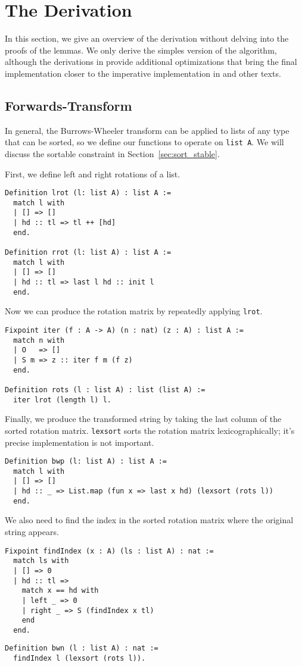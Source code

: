 \documentclass[11pt]{article}
\begin{document}
\section{The Derivation}
\label{sec:deriv}
In this section, we give an overview of the derivation without delving
into the proofs of the lemmas. We only derive the simples version of
the algorithm, although the derivations in \cite{birdmu,pearls}
provide additional optimizations that bring the final implementation
closer to the imperative implementation in \cite{bw} and other texts.

\subsection{Forwards-Transform}
\label{subsec:ft}
In general, the Burrows-Wheeler transform can be applied to lists of
any type that can be sorted, so we define our functions to operate on
\verb|list A|. We will discuss the sortable constraint in
Section~\autoref{sec:sort_stable}.

First, we define left and right rotations of a list.
\begin{verbatim}
Definition lrot (l: list A) : list A :=
  match l with
  | [] => []
  | hd :: tl => tl ++ [hd]
  end.

Definition rrot (l: list A) : list A :=
  match l with
  | [] => []
  | hd :: tl => last l hd :: init l
  end.
\end{verbatim}

Now we can produce the rotation matrix by repeatedly applying \verb|lrot|.
\begin{verbatim}
Fixpoint iter (f : A -> A) (n : nat) (z : A) : list A :=
  match n with
  | O   => []
  | S m => z :: iter f m (f z)
  end.

Definition rots (l : list A) : list (list A) :=
  iter lrot (length l) l.
\end{verbatim}

Finally, we produce the transformed string by taking the last column
of the sorted rotation matrix. \verb|lexsort| sorts the rotation matrix
lexicographically; it's precise implementation is not important.
\begin{verbatim}
Definition bwp (l: list A) : list A :=
  match l with
  | [] => []
  | hd :: _ => List.map (fun x => last x hd) (lexsort (rots l))
  end.
\end{verbatim}

We also need to find the index in the sorted rotation matrix where the
original string appears.
\begin{verbatim}
Fixpoint findIndex (x : A) (ls : list A) : nat :=
  match ls with
  | [] => 0
  | hd :: tl =>
    match x == hd with
    | left _ => 0
    | right _ => S (findIndex x tl)
    end
  end.
\end{verbatim}
\begin{verbatim}
Definition bwn (l : list A) : nat :=
  findIndex l (lexsort (rots l)).
\end{verbatim}
\end{document}
